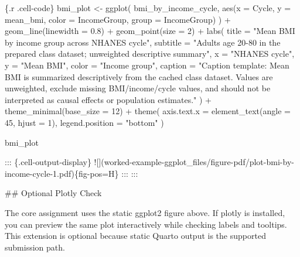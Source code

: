 \documentclass[
  letterpaper,
  DIV=11,
  numbers=noendperiod,
  oneside]{scrreprt}
\newenvironment{Shaded}{\begin{snugshade}}{\end{snugshade}}
\newcommand{\AlertTok}[1]{\textcolor[rgb]{0.68,0.00,0.00}{#1}}
\newcommand{\AttributeTok}[1]{\textcolor[rgb]{0.40,0.45,0.13}{#1}}
\newcommand{\DecValTok}[1]{\textcolor[rgb]{0.68,0.00,0.00}{#1}}
\newcommand{\FloatTok}[1]{\textcolor[rgb]{0.68,0.00,0.00}{#1}}
\newcommand{\FunctionTok}[1]{\textcolor[rgb]{0.28,0.35,0.67}{#1}}
\newcommand{\InformationTok}[1]{\textcolor[rgb]{0.37,0.37,0.37}{#1}}
\newcommand{\NormalTok}[1]{\textcolor[rgb]{0.00,0.23,0.31}{#1}}
\newcommand{\OtherTok}[1]{\textcolor[rgb]{0.00,0.23,0.31}{#1}}
\newcommand{\SpecialCharTok}[1]{\textcolor[rgb]{0.37,0.37,0.37}{#1}}
\newcommand{\StringTok}[1]{\textcolor[rgb]{0.13,0.47,0.30}{#1}}
\begin{document}
\begin{Shaded}
\begin{Highlighting}[numbers=left,,]
\InformationTok{\textasciigrave{}\textasciigrave{}\textasciigrave{}\{.r .cell{-}code\}}
\NormalTok{bmi\_plot }\OtherTok{\textless{}{-}} \FunctionTok{ggplot}\NormalTok{(}
\NormalTok{  bmi\_by\_income\_cycle,}
  \FunctionTok{aes}\NormalTok{(}\AttributeTok{x =}\NormalTok{ Cycle, }\AttributeTok{y =}\NormalTok{ mean\_bmi, }\AttributeTok{color =}\NormalTok{ IncomeGroup, }\AttributeTok{group =}\NormalTok{ IncomeGroup)}
\NormalTok{) }\SpecialCharTok{+}
  \FunctionTok{geom\_line}\NormalTok{(}\AttributeTok{linewidth =} \FloatTok{0.8}\NormalTok{) }\SpecialCharTok{+}
  \FunctionTok{geom\_point}\NormalTok{(}\AttributeTok{size =} \DecValTok{2}\NormalTok{) }\SpecialCharTok{+}
  \FunctionTok{labs}\NormalTok{(}
    \AttributeTok{title =} \StringTok{"Mean BMI by income group across NHANES cycle"}\NormalTok{,}
    \AttributeTok{subtitle =} \StringTok{"Adults age 20{-}80 in the prepared class dataset; unweighted descriptive summary"}\NormalTok{,}
    \AttributeTok{x =} \StringTok{"NHANES cycle"}\NormalTok{,}
    \AttributeTok{y =} \StringTok{"Mean BMI"}\NormalTok{,}
    \AttributeTok{color =} \StringTok{"Income group"}\NormalTok{,}
    \AttributeTok{caption =} \StringTok{"Caption template: Mean BMI is summarized descriptively from the cached class dataset. Values are unweighted, exclude missing BMI/income/cycle values, and should not be interpreted as causal effects or population estimates."}
\NormalTok{  ) }\SpecialCharTok{+}
  \FunctionTok{theme\_minimal}\NormalTok{(}\AttributeTok{base\_size =} \DecValTok{12}\NormalTok{) }\SpecialCharTok{+}
  \FunctionTok{theme}\NormalTok{(}
    \AttributeTok{axis.text.x =} \FunctionTok{element\_text}\NormalTok{(}\AttributeTok{angle =} \DecValTok{45}\NormalTok{, }\AttributeTok{hjust =} \DecValTok{1}\NormalTok{),}
    \AttributeTok{legend.position =} \StringTok{"bottom"}
\NormalTok{  )}

\NormalTok{bmi\_plot}
\InformationTok{\textasciigrave{}\textasciigrave{}\textasciigrave{}}

\NormalTok{::: \{.cell{-}output{-}display\}}
\AlertTok{![](worked{-}example{-}ggplot\_files/figure{-}pdf/plot{-}bmi{-}by{-}income{-}cycle{-}1.pdf)}\NormalTok{\{fig{-}pos=\textquotesingle{}H\textquotesingle{}\}}
\NormalTok{:::}
\NormalTok{:::}


\FunctionTok{\#\# Optional Plotly Check}

\NormalTok{The core assignment uses the static }\InformationTok{\textasciigrave{}ggplot2\textasciigrave{}}\NormalTok{ figure above. If }\InformationTok{\textasciigrave{}plotly\textasciigrave{}}\NormalTok{ is installed, you can preview the same plot interactively while checking labels and tooltips. This extension is optional because static Quarto output is the supported submission path.}



\end{Highlighting}
\end{Shaded}
\end{document}
